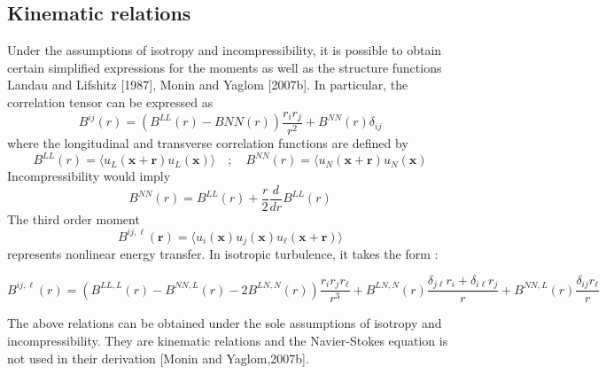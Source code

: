 \subsection{Kinematic relations}
Under the assumptions of isotropy and incompressibility, it is possible to obtain certain simplified expressions for the moments as well as the structure functions Landau and Lifshitz [1987], Monin and Yaglom [2007b]. In particular, the correlation tensor can be expressed as
\begin{equation}
    B^{ij}(r)=(B^{LL}(r)-B{NN}(r))\frac{r_ir_j}{r^2}+B^{NN}(r)\delta_{ij}
\end{equation}
where the longitudinal and transverse correlation functions are defined by
\begin{equation}
    B^{LL}(r)=\langle u_L(\mathbf{x+r})u_L(\mathbf{x})\rangle\quad;\quad B^{NN}(r)=\langle u_N(\mathbf{x+r})u_N(\mathbf{x})
\end{equation}
Incompressibility would imply
\begin{equation}
    B^{NN}(r)=B^{LL}(r)+\frac{r}{2}\frac{d}{dr}B^{LL}(r)
\end{equation}
The third order moment 
\begin{equation}
    B^{ij,\ell}(\mathbf{r})=\langle u_i(\mathbf{x})u_j(\mathbf{x})u_\ell(\mathbf{x+r})\rangle
\end{equation}
represents nonlinear energy transfer. In isotropic turbulence, it takes the form :
\begin{fullwidth}
\begin{equation}
    B^{ij,\ell}(r)=\left(B^{LL,L}(r)-B^{NN,L}(r)-2B^{LN,N}(r)\right)\frac{r_ir_jr_\ell}{r^3}+B^{LN,N}(r)\frac{\delta_{j\ell}r_i+\delta_{i\ell}r_j}{r}+B^{NN,L}(r)\frac{\delta_{ij}r_\ell}{r}
\end{equation}
\end{fullwidth}
The above relations can be obtained under the sole assumptions of isotropy and incompressibility. They
are kinematic relations and the Navier-Stokes equation is not used in their derivation [Monin and Yaglom,2007b].

